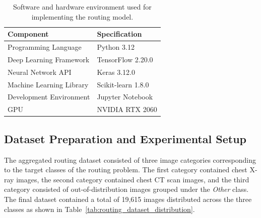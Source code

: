 \begin{table}[H]
	\centering
	\caption{Software and hardware environment used for implementing the routing model.}
	\label{tab:routing_tools}
	\begin{tabular}{|l|l|}
		\hline
		\textbf{Component} & \textbf{Specification} \\
		\hline
		Programming Language & Python 3.12 \\
		\hline
		Deep Learning Framework & TensorFlow 2.20.0 \\
		\hline
		Neural Network API & Keras 3.12.0 \\
		\hline
		Machine Learning Library & Scikit-learn 1.8.0 \\
		\hline
		Development Environment & Jupyter Notebook \\
		\hline
		GPU & NVIDIA RTX 2060 \\
		\hline
	\end{tabular}
\end{table}

\subsection{Dataset Preparation and Experimental Setup}

The aggregated routing dataset consisted of three image categories corresponding to the target classes of the routing problem. The first category contained chest X-ray images, the second category contained chest CT scan images, and the third category consisted of out-of-distribution images grouped under the \emph{Other} class. The final dataset contained a total of 19,615 images distributed across the three classes as shown in Table~\ref{tab:routing_dataset_distribution}.

